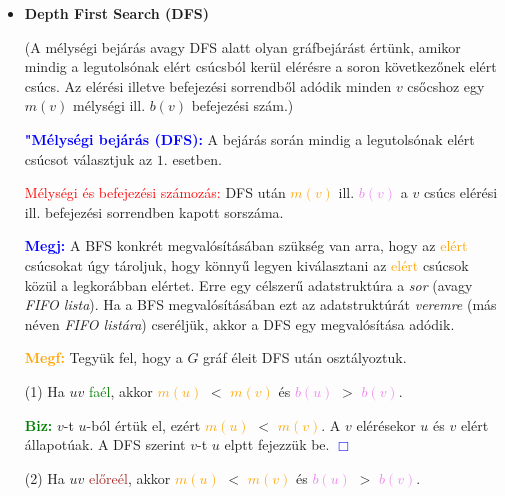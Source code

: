 \documentclass[../../szobeli.tex]{subfiles}
\begin{document}
\begin{center}
    \noindent{}
\end{center}

    \begin{itemize}
        \item \textbf{Depth First Search (DFS)}
        
        (A mélységi bejárás avagy DFS alatt olyan gráfbejárást értünk, amikor mindig a legutolsónak elért csúcsból kerül elérésre a soron következőnek elért csúcs. Az elérési illetve befejezési sorrendből adódik minden $v$ csőcshoz egy $m(v)$ mélységi ill. $b(v)$ befejezési szám.)

        \textcolor{blue}{\textbf{"Mélységi bejárás (DFS):}} A bejárás során mindig a legutolsónak elért csúcsot választjuk az $\boxed{1.}$ esetben.

        \textcolor{red}{Mélységi és befejezési számozás:} DFS után \textcolor{orange}{$m(v)$} ill. \textcolor{violet}{$b(v)$} a $v$ csúcs elérési ill. befejezési sorrendben kapott sorszáma.

        \textcolor{blue}{\textbf{Megj:}} A BFS konkrét megvalósításában szükség van arra, hogy az \textcolor{orange}{elért} csúcsokat úgy tároljuk, hogy könnyű legyen kiválasztani az \textcolor{orange}{elért} csúcsok közül a legkorábban elértet. Erre egy célszerű adatstruktúra a \textit{sor} (avagy \textit{FIFO lista}). Ha a BFS megvalósításában ezt az adatstruktúrát \textit{veremre} (más néven \textit{FIFO listára}) cseréljük, akkor a DFS egy megvalósítása adódik.

        \textcolor{orange}{\textbf{Megf:}} Tegyük fel, hogy a $G$ gráf éleit DFS után osztályoztuk. 
        
        (1) Ha $uv$ \textcolor{green}{faél}, akkor \textcolor{orange}{$m(u)$} $<$ \textcolor{orange}{$m(v)$} és \textcolor{violet}{$b(u)$} $>$ \textcolor{violet}{$b(v)$}.

        \textcolor{green}{\textbf{Biz:}} $v$-t $u$-ból értük el, ezért \textcolor{orange}{$m(u)$} $<$ \textcolor{orange}{$m(v)$}. A $v$ elérésekor $u$ és $v$ elért állapotúak. A DFS szerint $v$-t $u$ elptt fejezzük be.  \textcolor{blue}{$\Box$} 

        (2) Ha $uv$ \textcolor{brown}{előreél}, akkor \textcolor{orange}{$m(u)$} $<$ \textcolor{orange}{$m(v)$} és \textcolor{violet}{$b(u)$} $>$ \textcolor{violet}{$b(v)$}.


\end{itemize}
\end{document}
